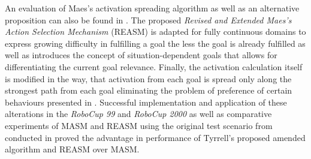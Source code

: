 An evaluation of Maes's activation spreading algorithm as well as an alternative proposition can also be found in \cite{dorer}. The proposed \textit{Revised and Extended Maes's Action Selection Mechanism} (REASM) is adapted for fully continuous domains to express growing difficulty in fulfilling a goal the less the goal is already fulfilled as well as introduces the concept of situation-dependent goals that allows for differentiating the current goal relevance. Finally, the activation calculation itself is modified in the way, that activation from each goal is spread only along the strongest path from each goal eliminating the problem of preference of certain behaviours presented in \cite{tyrrell}. Successful implementation and application of these alterations in the \textit{RoboCup 99} \cite{dorer-robocup99} and \textit{RoboCup 2000} \cite{sbc++} as well as comparative experiments of MASM and REASM using the original test scenario from \cite{maes2} conducted in \cite{dorer} proved the advantage in performance of Tyrrell's proposed amended algorithm and REASM over MASM. \par
\begin{comment}
https://www.researchgate.net/profile/Jacques_Ferber/publication/228577633_An_extension_of_Maes'_action_selection_mechanism_for_animats/links/004635151e052564ed000000.pdf
https://link.springer.com/content/pdf/10.1007%
\end{comment}
